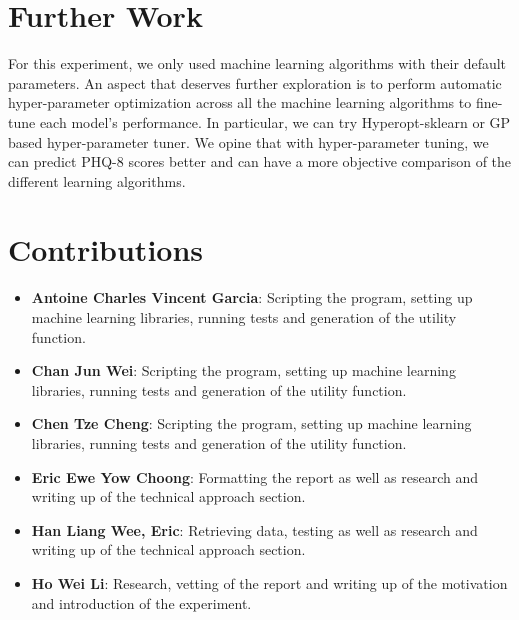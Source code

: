 \documentclass{article}
\begin{document}
	\section{Further Work}
	For this experiment, we only used machine learning algorithms with their default parameters. 
	An aspect that deserves further exploration is to perform automatic hyper-parameter optimization
	across all the machine learning algorithms to fine-tune each model's performance. 
	In particular, we can try Hyperopt-sklearn \cite{Komer2014HyperoptsklearnAH} or GP based hyper-parameter tuner. 
	We opine that with hyper-parameter tuning, we can predict PHQ-8 scores better and can have a more objective comparison of the different learning algorithms.
	
	\section{Contributions}
	\begin{itemize}
		\item \textbf{Antoine Charles Vincent Garcia}: 
		Scripting the program, setting up machine learning libraries, running tests and generation of the utility function.
		\item \textbf{Chan Jun Wei}: 
		Scripting the program, setting up machine learning libraries, running tests and generation of the utility function.
		\item \textbf{Chen Tze Cheng}: 
		Scripting the program, setting up machine learning libraries, running tests and generation of the utility function.
		\item \textbf{Eric Ewe Yow Choong}: 
		Formatting the report as well as research and writing up of the technical approach section.
		\item \textbf{Han Liang Wee, Eric}: 
		Retrieving data, testing as well as research and writing up of the technical approach section.
		\item \textbf{Ho Wei Li}: 
		Research, vetting of the report and writing up of the motivation and introduction of the experiment. \\
	\end{itemize}
	
	
	{\scriptsize }
\end{document}
